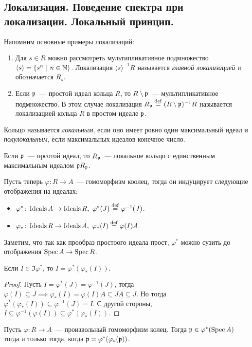 	\subsection{Локализация. Поведение спектра при локализации. Локальный принцип.}

	Напомним основные примеры локализаций:

	\begin{enumerate}
		\item Для $s \in R$ можно рассмотреть мультипликативное подмножество $\langle s \rangle = \{ s^n \ \vert \ n \in \mathbb{N} \}$.  Локализация $\langle s \rangle^{-1}R$ называется \emph{главной локализацией} и обозначается $R_{s}$.

		\item Если $\mathfrak{p}$~--- простой идеал кольца $R$, то $R \setminus \mathfrak{p}$~--- мультипликативное подмножество. В этом случае локализация $R_{\mathfrak{p}} \stackrel{\mathrm{def}}{=} (R\setminus \mathfrak{p})^{-1}R$ называется локализацией кольца $R$ в простом идеале $\mathfrak{p}$.

	\end{enumerate}

	\begin{definition} 
		Кольцо называется \emph{локальным}, если оно имеет ровно один максимальный идеал и \emph{полулокальным}, если максимальных идеалов конечное число. 
	\end{definition}

	Если $\mathfrak{p}$~--- прсотой идеал, то $R_{\mathfrak{p}}$~--- локальное кольцо с единственным максимальным идеалом $\mathfrak{p} R_{\mathfrak{p}}$. 

	Пусть теперь $\varphi\colon R \to A$~--- гомоморфизм коолец, тогда он индуцирует следующие отображения на идеалах: 
	\begin{itemize}
		\item $\varphi^{*}\colon \operatorname{Ideals}{A} \to \operatorname{Ideals}{R}, \ \varphi^{*}(J) \stackrel{\mathrm{def}}{=} \varphi^{-1}(J)$.
		\item $\varphi_{*}\colon \operatorname{Ideals}{R} \to \operatorname{Ideals}{A}, \ \varphi_{*}(I) \stackrel{\mathrm{def}}{=}  \varphi(I)A$.
	\end{itemize}

	Заметим, что так как прообраз простоого идеала прост, $\varphi^{*}$ можно сузить до отображения $\operatorname{Spec}{A} \to \operatorname{Spec}{R}$.

	\begin{lemma} 
		Если $I \in \Im{\varphi^{*}}$, то $I = \varphi^{*}(\varphi_{*}(I))$.
	\end{lemma}
	\begin{proof}
		Пусть $I = \varphi^{*}(J) = \varphi^{-1}(J)$, тогда $\varphi(I) \subseteq J \implies  \varphi_{*}(I) = \varphi(I)A \subseteq JA \subseteq J$. Но тогда $\varphi^{*}(\varphi_{*}(I)) \subseteq \varphi^{-1}(J) = I$. С другой стороны, $I \subseteq \varphi^{-1}(\varphi(I)) \subseteq \varphi^{*}(\varphi_{*}(I))$.
	\end{proof}

	\begin{lemma} 
		Пусть $\varphi\colon R \to A$~--- произвольный гомоморфизм колец. Тогда $\fp \in \varphi^{*}\lr*{\Spec{A}}$ тогда и только тогда, когда $\mathfrak{p} = \varphi^{*}(\varphi_{*}(\mathfrak{p}))$.
	\end{lemma}


